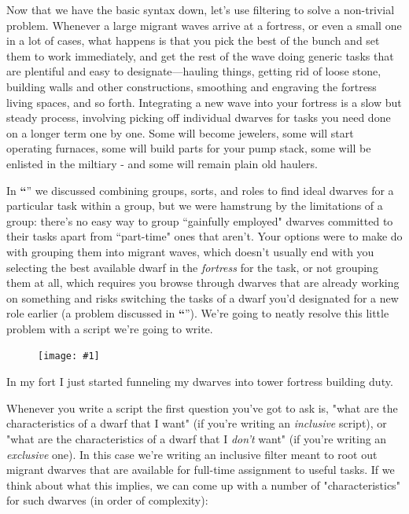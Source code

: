 \documentclass[]{article}
\newcommand{\jump}[1] {\textbf{``\nameref{sec:#1}}''}
\newcommand{\legacy}[1] {
\begin{center}
\colorbox{legacy-content}{
\begin{minipage}[t]{0.95\linewidth}
#1
\end{minipage}
}
\end{center}
}
\newcommand{\fullfigure}[1] {
\begin{figure}[h!]
\texttt{[image: \#1]}
\end{figure}
}
\newcommand{\fullfigurecaption}[1] {
\begin{center}
\vspace{-12pt}
#1
\end{center}
}
\begin{document}

Now that we have the basic syntax down, let's use filtering to solve a non-trivial problem. Whenever a
large migrant waves arrive at a fortress, or even a small one in a lot of cases, what happens is that you
pick the best of the bunch and set them to work immediately, and get the rest of the wave doing generic
tasks that are plentiful and easy to designate---hauling things, getting rid of loose stone, building
walls and other constructions, smoothing and engraving the fortress living spaces, and so forth.
Integrating a new wave into your fortress is a slow but steady process, involving picking off individual
dwarves for tasks you need done on a longer term one by one. Some will become jewelers, some will start
operating furnaces, some will build parts for your pump stack, some will be enlisted in the miltiary -
and some will remain plain old haulers.

In  \jump{Using Roles} we discussed combining groups, sorts, and roles to find ideal
dwarves for a particular task within a group, but we were hamstrung by the limitations of a group:
there's no easy way to group ``gainfully employed" dwarves committed to their tasks apart from
``part-time" ones that aren't. Your options were to make do with grouping them into migrant waves, which
doesn't usually end with you selecting the best available dwarf in the \emph{fortress} for the task, or
not grouping them at all, which requires you browse through dwarves that are already working on something
and risks switching the tasks of a dwarf you'd designated for a new role earlier (a problem discussed in
\jump{Assigning Nicknames}). We're going to neatly resolve this little problem with a
script we're going to write.

\fullfigure{Sec4Fig2}
\fullfigurecaption{In my fort I just started funneling my dwarves into tower fortress building duty.}

Whenever you write a script the first question you've got to ask is, "what are the characteristics of a
dwarf that I want" (if you're writing an \emph{inclusive} script), or "what are the characteristics of a
dwarf that I \emph{don't} want" (if you're writing an \emph{exclusive} one). In this case we're writing
an inclusive filter meant to root out migrant dwarves that are available for full-time assignment to
useful tasks. If we think about what this implies, we can come up with a number of "characteristics" for
such dwarves (in order of complexity):
\end{document}
